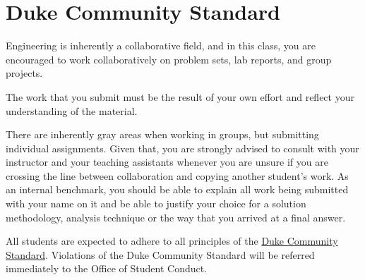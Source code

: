 \section{Duke Community Standard}
Engineering is inherently a collaborative field, and in this class, you are
encouraged to work collaboratively on problem sets, lab reports, and group
projects.  
 
The work that you submit must be the result of your own effort and reflect
your understanding of the material.  
  
There are inherently gray areas when working in groups, but submitting
individual assignments.   Given that, you are strongly advised to consult with
your instructor and your teaching assistants whenever you are unsure if you are
crossing the line between collaboration and copying another student's work.  As an
internal benchmark, you should be able to explain all work being submitted with
your name on it and be able to justify your choice for a solution methodology,
analysis technique or the way that you arrived at a final answer.

All students are expected to adhere to all principles of the
\href{http://www.integrity.duke.edu/standard.html}{Duke Community Standard}.
Violations of the Duke Community Standard will be referred immediately to the
Office of Student Conduct.
